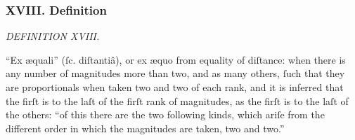 \documentclass[11pt,preview]{standalone}
\begin{document}
\subsubsection{XVIII. Definition}

\begin{minipage}{\textwidth}

    \begin{center}
        \textit{DEFINITION XVIII.}\label{book5def18} \\
    \end{center}

    \hfill
\end{minipage}

\raggedright “Ex \ae quali” (ſc. diſtantiâ), or ex æquo from equality of diſtance: when there is any number of magnitudes more than two, and as many others, ſuch that they are proportionals when taken two and two of each rank, and it is inferred that the firſt is to the laſt of the firſt rank of magnitudes, as the firſt is to the laſt of the others: “of this there are the two following kinds, which ariſe from the different order in which the magnitudes are taken, two and two.”
\end{document}
